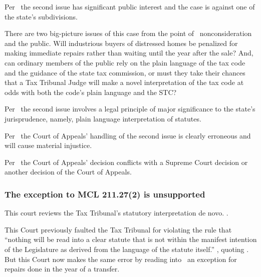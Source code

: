 \documentclass[12pt,\documentclassflag]{michiganCourtOfAppealsBrief}
\begin{document}
Per \cite{MCR 7.305(B)(2)}\ the second issue has significant public interest and the case is against one of the state's subdivisions.

There are two big-picture issues of this case from the point of \mathieuGast\ nonconsideration and the public. Will industrious buyers of distressed homes be penalized for making immediate repairs rather than waiting until the year after the sale? And, can ordinary members of the public rely on the plain language of the tax code and the guidance of the state tax commission, or must they take their chances that a Tax Tribunal Judge will make a novel interpretation of the tax code at odds with both the code's plain language and the STC?


Per \cite{MCR 7.305(B)(3)}\ the second issue involves a legal principle of major significance to the state's jurisprudence, namely, plain language interpretation of statutes. 

Per \cite{MCR 7.305(B)(5a)}\ the Court of Appeals' handling of the second issue is clearly erroneous and will cause material injustice.

Per \cite{MCR 7.305(B)(5b)}\ the Court of Appeals' decision conflicts with a Supreme Court decision or another decision of the Court of Appeals. 

\subsubsection{The exception to MCL 211.27(2) is unsupported}

This court reviews the Tax Tribunal's statutory interpretation de novo. .

This Court previously faulted the Tax Tribunal for violating the rule that ``nothing will be read into a clear statute that is not within the manifest intention of the Legislature as derived from the language of the statute itself.'' , quoting . But this Court now makes the same error by reading into \mathieuGast\ an exception for repairs done in the year of a transfer. 

\end{document}

